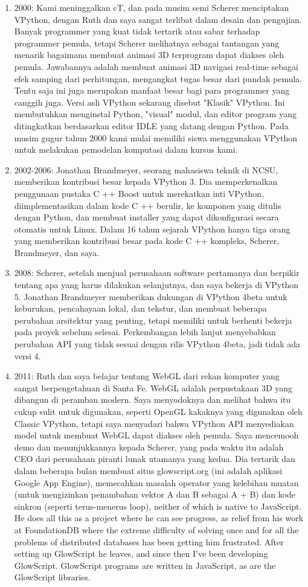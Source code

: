 \begin{enumerate}
			\item 2000: Kami meninggalkan cT, dan pada musim semi Scherer menciptakan VPython, dengan Ruth dan saya sangat terlibat dalam desain dan pengujian. Banyak programmer yang kuat tidak tertarik atau sabar terhadap programmer pemula, tetapi Scherer melihatnya sebagai tantangan yang menarik bagaimana membuat animasi 3D terprogram dapat diakses oleh pemula. Jawabannya adalah membuat animasi 3D navigasi real-time sebagai efek samping dari perhitungan, mengangkat tugas besar dari pundak pemula. Tentu saja ini juga merupakan manfaat besar bagi para programmer yang canggih juga. Versi asli VPython sekarang disebut "Klasik" VPython. Ini membutuhkan menginstal Python, "visual" modul, dan editor program yang ditingkatkan berdasarkan editor IDLE yang datang dengan Python. Pada musim gugur tahun 2000 kami mulai memiliki siswa menggunakan VPython untuk melakukan pemodelan komputasi dalam kursus kami.
			\item 2002-2006: Jonathan Brandmeyer, seorang mahasiswa teknik di NCSU, memberikan kontribusi besar kepada VPython 3. Dia memperkenalkan penggunaan pustaka C ++ Boost untuk merekatkan inti VPython, diimplementasikan dalam kode C ++ berulir, ke komponen yang ditulis dengan Python, dan membuat installer yang dapat dikonfigurasi secara otomatis untuk Linux. Dalam 16 tahun sejarah VPython hanya tiga orang yang memberikan kontribusi besar pada kode C ++ kompleks, Scherer, Brandmeyer, dan saya.
			\item 2008: Scherer, setelah menjual perusahaan software pertamanya dan berpikir tentang apa yang harus dilakukan selanjutnya, dan saya bekerja di VPython 5. Jonathan Brandmeyer memberikan dukungan di VPython 4beta untuk keburukan, pencahayaan lokal, dan tekstur, dan membuat beberapa perubahan arsitektur yang penting, tetapi memiliki untuk berhenti bekerja pada proyek sebelum selesai. Perkembangan lebih lanjut menyebabkan perubahan API yang tidak sesuai dengan rilis VPython 4beta, jadi tidak ada versi 4.
			\item 2011: Ruth dan saya belajar tentang WebGL dari rekan komputer yang sangat berpengetahuan di Santa Fe. WebGL adalah perpustakaan 3D yang dibangun di peramban modern. Saya menyodoknya dan melihat bahwa itu cukup sulit untuk digunakan, seperti OpenGL kakaknya yang digunakan oleh Classic VPython, tetapi saya menyadari bahwa VPython API menyediakan model untuk membuat WebGL dapat diakses oleh pemula. Saya mencemooh demo dan menunjukkannya kepada Scherer, yang pada waktu itu adalah CEO dari perusahaan piranti lunak utamanya yang kedua. Dia tertarik dan dalam beberapa bulan membuat situs glowscript.org (ini adalah aplikasi Google App Engine), memecahkan masalah operator yang kelebihan muatan (untuk mengizinkan penambahan vektor A dan B sebagai A + B) dan kode sinkron (seperti terus-menerus loop), neither of which is native to JavaScript. He does all this as a project where he can see progress, as relief from his work at FoundationDB where the extreme difficulty of solving once and for all the problems of distributed databases has been getting him frustrated. After setting up GlowScript he leaves, and since then I’ve been developing GlowScript. GlowScript programs are written in JavaScript, as are the GlowScript libraries.
		\end{enumerate}
